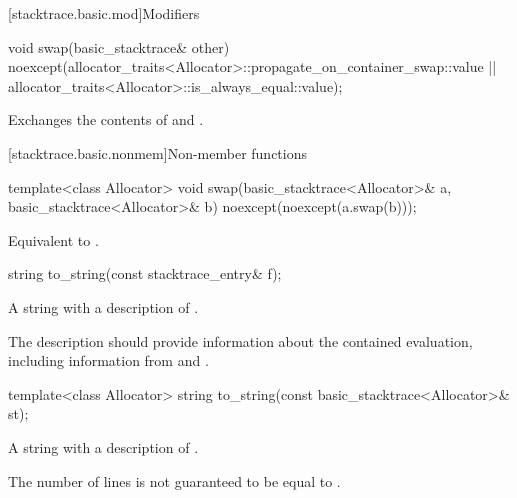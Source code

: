 [stacktrace.basic.mod]{Modifiers}

%
\begin{itemdecl}
void swap(basic_stacktrace& other)
  noexcept(allocator_traits<Allocator>::propagate_on_container_swap::value ||
    allocator_traits<Allocator>::is_always_equal::value);
\end{itemdecl}

\begin{itemdescr}
\pnum
\effects
Exchanges the contents of  and .
\end{itemdescr}

[stacktrace.basic.nonmem]{Non-member functions}

%
\begin{itemdecl}
template<class Allocator>
void swap(basic_stacktrace<Allocator>& a, basic_stacktrace<Allocator>& b)
  noexcept(noexcept(a.swap(b)));
\end{itemdecl}

\begin{itemdescr}
\pnum
\effects
Equivalent to .
\end{itemdescr}

%
\begin{itemdecl}
string to_string(const stacktrace_entry& f);
\end{itemdecl}

\begin{itemdescr}
\pnum
\returns
A string with a description of .

\recommended
The description should provide information about the contained evaluation,
including information from
 and .
\end{itemdescr}

%
\begin{itemdecl}
template<class Allocator>
string to_string(const basic_stacktrace<Allocator>& st);
\end{itemdecl}

\begin{itemdescr}
\pnum
\returns
A string with a description of .
\begin{note}
The number of lines is not guaranteed to be equal to .
\end{note}
\end{itemdescr}

